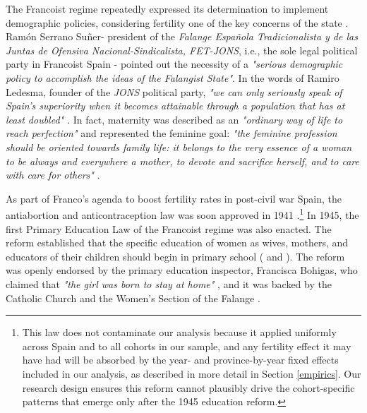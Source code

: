 \documentclass[a4paper,oneside,final,onecolumn,12pt,english]{article}
\begin{document}
The Francoist regime repeatedly expressed its determination to implement demographic policies, considering fertility one of the key concerns of the state \citep[][p. 160]{bock_thane}. Ram\'on Serrano Suñer- president of the \textit{Falange Española Tradicionalista y de las Juntas de Ofensiva Nacional-Sindicalista, FET-JONS}, i.e., the sole legal political party in Francoist Spain - pointed out the necessity of a \textit{"serious demographic policy to accomplish the ideas of the Falangist State"}. In the words of Ramiro Ledesma, founder of the \textit{JONS} political party, \textit{"we can only seriously speak of Spain's superiority when it becomes attainable through a population that has at least doubled" \citep[][p. 33]{bosch_maestro}}. In fact, maternity was described as an \textit{"ordinary way of life to reach perfection"} \citep[][p. 31]{martinezmedrano1959historia} and represented the feminine goal: \textit{"the feminine profession should be oriented towards family life: it belongs to the very essence of a woman to be always and everywhere a mother, to devote and sacrifice herself, and to care with care for others"} \citep[][p. 21]{jaen1959orientacion}. %

As part of Franco's agenda to boost fertility rates in post-civil war Spain, the antiabortion and anticontraception law was soon approved in 1941 \citep[][p. 768-770]{boe1941}.\footnote{This law does not contaminate our analysis because it applied uniformly across Spain and to all cohorts in our sample, and any fertility effect it may have had will be absorbed by the year- and province-by-year fixed effects included in our analysis, as described in more detail in Section \ref{empirics}. Our research design ensures this reform cannot plausibly drive the cohort-specific patterns that emerge only after the 1945 education reform.} In 1945, the first Primary Education Law of the Francoist regime was also enacted. The reform established that the specific education of women as wives, mothers, and educators of their children should begin in primary school (\cite[][ p. 46]{rabazas2006construccion} and \cite[][p. 295-296]{school_aparatus}). The reform was openly endorsed by the primary education inspector, Francisca Bohigas, who claimed that \textit{"the girl was born to stay at home"} \citep[p. 10,][]{consigna1941}, and it was backed by the Catholic Church and the Women's Section of the Falange \citep[p. 212]{perez_canto}. %
\end{document}
